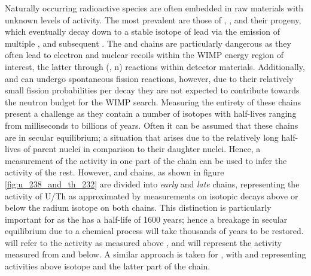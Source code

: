 Naturally occurring radioactive species are often embedded in raw materials with unknown levels of activity. The most prevalent are those of \UTTE{}, \UTTF{}, \ThTTT{} and their progeny, which eventually decay down to a stable isotope of lead via the emission of multiple \alpha{}, \beta{} and subsequent \grays{}. The \UTTE{} and \ThTTT{} chains are particularly dangerous as they often lead to electron and nuclear recoils within the WIMP energy region of interest, the latter through (\alpha, n) reactions within detector materials. Additionally, \UTTF{} and \UTTE{} can undergo spontaneous fission reactions, however, due to their relatively small fission probabilities per decay they are not expected to contribute towards the neutron budget for the WIMP search. 
Measuring the entirety of these chains present a challenge as they contain a number of isotopes with half-lives ranging from milliseconds to billions of years. Often it can be assumed that these chains are in secular equilibrium; a situation that arises due to the relatively long half-lives of parent nuclei in comparison to their daughter nuclei. Hence, a measurement of the activity in one part of the chain can be used to infer the activity of the rest. 
However, \UTTE{} and \ThTTT{} chains, as shown in figure \ref{fig:u_238_and_th_232} are divided into \textit{early} and \textit{late} chains, representing the activity of U/Th as approximated by measurements on isotopic decays above or below the radium isotope on both chains. This distinction is particularly important for \UTTE{} as the \RaTTS{} has a half-life of 1600 years; hence a breakage in secular equilibrium due to a chemical process will take thousands of years to be restored. \UTTEe{} will refer to the \UTTE{} activity as measured above \RaTTS{}, and \UTTEl{} will represent the activity measured from \RaTTS{} and below. A similar approach is taken for \ThTTT{}, with \ThTTTe{} and \ThTTTl{} representing activities above \RaTTE{} isotope and the latter part of the chain.
%
